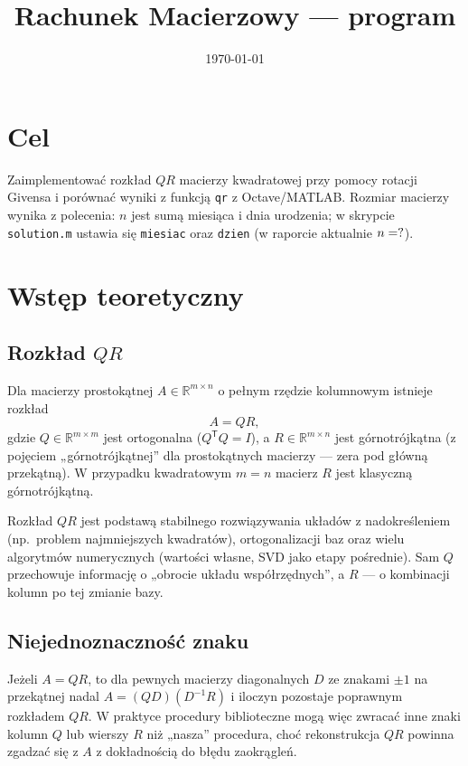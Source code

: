 \documentclass[polish]{template/projectreport}
\title{\TytulZadania\\{\large Rachunek Macierzowy --- program \NumerProgramu}}
\author{\Autorzy}
\date{\today}
\begin{document}
\maketitle


\section{Cel}
Zaimplementować rozkład $QR$ macierzy kwadratowej przy pomocy rotacji Givensa i porównać wyniki z funkcją
\texttt{qr} z Octave/MATLAB. Rozmiar macierzy wynika z polecenia: $n$ jest sumą miesiąca i dnia urodzenia;
w skrypcie \texttt{solution.m} ustawia się \texttt{miesiac} oraz \texttt{dzien} (w raporcie aktualnie $n=?$).

\section{Wstęp teoretyczny}

\subsection{Rozkład $QR$}
Dla macierzy prostokątnej $A\in\mathbb{R}^{m\times n}$ o pełnym rzędzie kolumnowym istnieje rozkład
\begin{equation}
  A = QR,
\end{equation}
gdzie $Q\in\mathbb{R}^{m\times m}$ jest ortogonalna ($Q^{\mathsf{T}}Q=I$), a $R\in\mathbb{R}^{m\times n}$
jest górnotrójkątna (z pojęciem „górnotrójkątnej'' dla prostokątnych macierzy --- zera pod główną przekątną).
W przypadku kwadratowym $m=n$ macierz $R$ jest klasyczną górnotrójkątną.

Rozkład $QR$ jest podstawą stabilnego rozwiązywania układów z nadokreśleniem (np.\ problem najmniejszych kwadratów),
ortogonalizacji baz oraz wielu algorytmów numerycznych (wartości własne, SVD jako etapy pośrednie). Sam $Q$
przechowuje informację o „obrocie układu współrzędnych'', a $R$ --- o kombinacji kolumn po tej zmianie bazy.

\subsection{Niejednoznaczność znaku}
Jeżeli $A=QR$, to dla pewnych macierzy diagonalnych $D$ ze znakami $\pm 1$ na przekątnej nadal
$A=(QD)(D^{-1}R)$ i iloczyn pozostaje poprawnym rozkładem $QR$. W praktyce procedury biblioteczne mogą więc
zwracać inne znaki kolumn $Q$ lub wierszy $R$ niż „nasza'' procedura, choć rekonstrukcja $QR$ powinna zgadzać się
z $A$ z dokładnością do błędu zaokrągleń.
\end{document}
